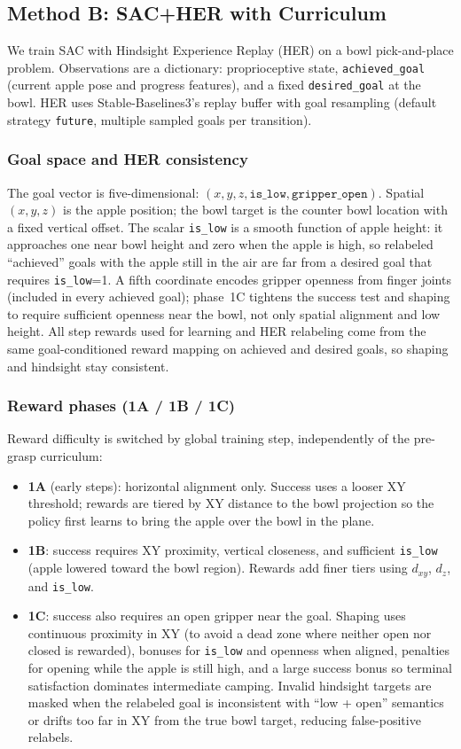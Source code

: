 \documentclass[11pt,a4paper]{article}
\begin{document}
\subsection{Method B: SAC+HER with Curriculum}
We train SAC with Hindsight Experience Replay (HER) on a bowl pick-and-place problem. Observations are a dictionary: proprioceptive state, \texttt{achieved\_goal} (current apple pose and progress features), and a fixed \texttt{desired\_goal} at the bowl. HER uses Stable-Baselines3's replay buffer with goal resampling (default strategy \texttt{future}, multiple sampled goals per transition).

\subsubsection{Goal space and HER consistency}
The goal vector is five-dimensional: \((x,y,z,\texttt{is\_low},\texttt{gripper\_open})\). Spatial \((x,y,z)\) is the apple position; the bowl target is the counter bowl location with a fixed vertical offset. The scalar \texttt{is\_low} is a smooth function of apple height: it approaches one near bowl height and zero when the apple is high, so relabeled ``achieved'' goals with the apple still in the air are far from a desired goal that requires \texttt{is\_low}=1. A fifth coordinate encodes gripper openness from finger joints (included in every achieved goal); phase~1C tightens the success test and shaping to require sufficient openness near the bowl, not only spatial alignment and low height. All step rewards used for learning and HER relabeling come from the same goal-conditioned reward mapping on achieved and desired goals, so shaping and hindsight stay consistent.

\subsubsection{Reward phases (1A / 1B / 1C)}
Reward difficulty is switched by global training step, independently of the pre-grasp curriculum:
\begin{itemize}
    \item \textbf{1A} (early steps): horizontal alignment only. Success uses a looser XY threshold; rewards are tiered by XY distance to the bowl projection so the policy first learns to bring the apple over the bowl in the plane.
    \item \textbf{1B}: success requires XY proximity, vertical closeness, and sufficient \texttt{is\_low} (apple lowered toward the bowl region). Rewards add finer tiers using \(d_{xy}\), \(d_z\), and \texttt{is\_low}.
    \item \textbf{1C}: success also requires an open gripper near the goal. Shaping uses continuous proximity in XY (to avoid a dead zone where neither open nor closed is rewarded), bonuses for \texttt{is\_low} and openness when aligned, penalties for opening while the apple is still high, and a large success bonus so terminal satisfaction dominates intermediate camping. Invalid hindsight targets are masked when the relabeled goal is inconsistent with ``low + open'' semantics or drifts too far in XY from the true bowl target, reducing false-positive relabels.
\end{itemize}
\end{document}

